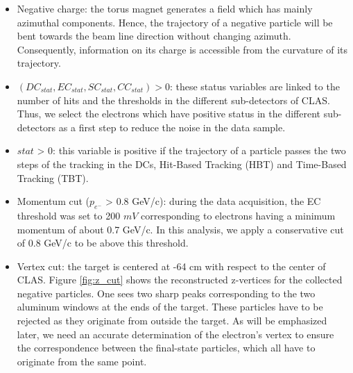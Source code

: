\begin{itemize}

\item Negative charge: the torus magnet generates a field which has mainly 
   azimuthal components. Hence, the trajectory of a negative particle will be 
   bent towards the beam line direction without changing azimuth.  
   Consequently, information on its charge is accessible from the curvature of 
   its trajectory.           

\item $(DC_{stat}, EC_{stat}, SC_{stat}, CC_{stat}) > 0$: these status 
   variables are linked to the number of hits and the thresholds in the 
   different sub-detectors of CLAS. Thus, we select the electrons which have 
   positive status in the different sub-detectors as a first step to reduce the 
   noise in the data sample.

\item $stat$ > 0: this variable is positive if the trajectory of a particle 
   passes the two steps of the tracking in the DCs, Hit-Based Tracking (HBT) 
   and Time-Based Tracking (TBT).

\item Momentum cut ($p_{e^{-}}$ > 0.8 GeV/c): during the data acquisition, the 
   EC threshold was set to 200 $mV$ corresponding to electrons having a minimum 
   momentum of about 0.7 GeV/c. In this analysis, we apply a conservative cut 
   of 0.8 GeV/c to be above this threshold.


\item Vertex cut: the target is centered at -64 cm with respect to the center 
   of CLAS. Figure \ref{fig:z_cut} shows the reconstructed z-vertices for the 
   collected negative particles. One sees two sharp peaks corresponding to the 
   two aluminum windows at the ends of the target. These particles have to be 
   rejected as they originate from outside the target. As will be emphasized 
   later, we need an accurate determination of the electron's vertex to ensure 
   the correspondence between the final-state particles, which all have to 
   originate from the same point.       
 

\end{itemize}
